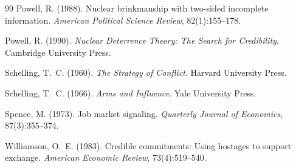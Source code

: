 \documentclass[12pt,a4paper]{article}
\begin{document}
\begin{thebibliography}{99}
Powell, R. (1988).
\newblock Nuclear brinkmanship with two-sided incomplete information.
\newblock \textit{American Political Science Review}, 82(1):155--178.

Powell, R. (1990).
\newblock \textit{Nuclear Deterrence Theory: The Search for Credibility}.
\newblock Cambridge University Press.

Schelling, T.~C. (1960).
\newblock \textit{The Strategy of Conflict}.
\newblock Harvard University Press.

Schelling, T.~C. (1966).
\newblock \textit{Arms and Influence}.
\newblock Yale University Press.

Spence, M. (1973).
\newblock Job market signaling.
\newblock \textit{Quarterly Journal of Economics}, 87(3):355--374.

Williamson, O.~E. (1983).
\newblock Credible commitments: Using hostages to support exchange.
\newblock \textit{American Economic Review}, 73(4):519--540.

\end{thebibliography}
\end{document}
